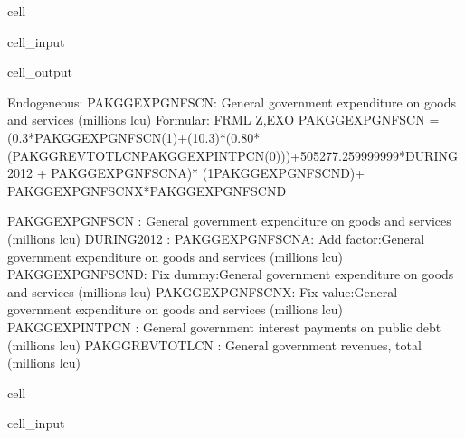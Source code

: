 \documentclass[letterpaper,10pt,english]{jupyterBook}
\begin{document}
\begin{sphinxuseclass}{cell}\begin{sphinxVerbatimInput}

\begin{sphinxuseclass}{cell_input}
\begin{sphinxVerbatim}[commandchars=\\\{\}]
\end{sphinxVerbatim}

\end{sphinxuseclass}\end{sphinxVerbatimInput}
\begin{sphinxVerbatimOutput}

\begin{sphinxuseclass}{cell_output}
\begin{sphinxVerbatim}[commandchars=\\\{\}]
Endogeneous: PAKGGEXPGNFSCN: General government expenditure on goods and services (millions lcu)
Formular: FRML \PYGZlt{}Z,EXO\PYGZgt{} PAKGGEXPGNFSCN = (0.3*PAKGGEXPGNFSCN(\PYGZhy{}1)+(1\PYGZhy{}0.3)*(0.80*(PAKGGREVTOTLCN\PYGZhy{}PAKGGEXPINTPCN(\PYGZhy{}0)))+505277.259999999*DURING\PYGZus{}2012 + PAKGGEXPGNFSCN\PYGZus{}A)* (1\PYGZhy{}PAKGGEXPGNFSCN\PYGZus{}D)+ PAKGGEXPGNFSCN\PYGZus{}X*PAKGGEXPGNFSCN\PYGZus{}D  \PYGZdl{}

PAKGGEXPGNFSCN  : General government expenditure on goods and services (millions lcu)
DURING\PYGZus{}2012     : 
PAKGGEXPGNFSCN\PYGZus{}A: Add factor:General government expenditure on goods and services (millions lcu)
PAKGGEXPGNFSCN\PYGZus{}D: Fix dummy:General government expenditure on goods and services (millions lcu)
PAKGGEXPGNFSCN\PYGZus{}X: Fix value:General government expenditure on goods and services (millions lcu)
PAKGGEXPINTPCN  : General government interest payments on public debt (millions lcu)
PAKGGREVTOTLCN  : General government revenues, total (millions lcu)
\end{sphinxVerbatim}

\end{sphinxuseclass}\end{sphinxVerbatimOutput}

\end{sphinxuseclass}
\begin{sphinxuseclass}{cell}\begin{sphinxVerbatimInput}

\begin{sphinxuseclass}{cell_input}
\begin{sphinxVerbatim}[commandchars=\\\{\}]
\end{sphinxVerbatim}

\end{sphinxuseclass}\end{sphinxVerbatimInput}

\end{sphinxuseclass}
\end{document}
